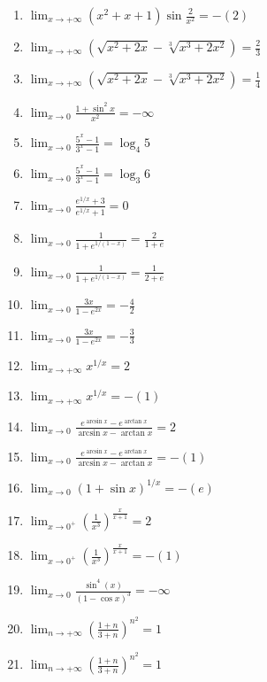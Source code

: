 \documentclass[11pt,a4paper]{article}
\begin{document}
\begin{enumerate}
\item $\displaystyle \lim_{x \to +\infty} (x^{2} + x + 1)\sin\frac{2}{x^{2}} = -\left(2\right)$
\item $\displaystyle \lim_{x \to +\infty} \left(\sqrt{x^{2} + 2x} - \sqrt[3]{x^{3} + 2x^{2}}\right) = \frac{2}{3}$
\item $\displaystyle \lim_{x \to +\infty} \left(\sqrt{x^{2} + 2x} - \sqrt[3]{x^{3} + 2x^{2}}\right) = \frac{1}{4}$
\item $\displaystyle \lim_{x \to 0} \frac{1 + \sin^{2} x}{x^{2}} = -\infty$
\item $\displaystyle \lim_{x \to 0} \frac{5^{x} - 1}{3^{x} - 1} = \log_{4} 5$
\item $\displaystyle \lim_{x \to 0} \frac{5^{x} - 1}{3^{x} - 1} = \log_{3} 6$
\item $\displaystyle \lim_{x \to 0} \frac{e^{1/x} + 3}{e^{1/x} + 1} = 0$
\item $\displaystyle \lim_{x \to 0} \frac{1}{1 + e^{1/(1 - x)}} = \frac{2}{1 + e}$
\item $\displaystyle \lim_{x \to 0} \frac{1}{1 + e^{1/(1 - x)}} = \frac{1}{2 + e}$
\item $\displaystyle \lim_{x \to 0} \frac{3x}{1 - e^{2x}} = -\frac{4}{2}$
\item $\displaystyle \lim_{x \to 0} \frac{3x}{1 - e^{2x}} = -\frac{3}{3}$
\item $\displaystyle \lim_{x \to +\infty} x^{1/x} = 2$
\item $\displaystyle \lim_{x \to +\infty} x^{1/x} = -\left(1\right)$
\item $\displaystyle \lim_{x \to 0} \frac{e^{\arcsin x} - e^{\arctan x}}{\arcsin x - \arctan x} = 2$
\item $\displaystyle \lim_{x \to 0} \frac{e^{\arcsin x} - e^{\arctan x}}{\arcsin x - \arctan x} = -\left(1\right)$
\item $\displaystyle \lim_{x \to 0} (1 + \sin x)^{1/x} = -\left(e\right)$
\item $\displaystyle \lim_{x \to 0^{+}} \left(\frac{1}{x^{3}}\right)^{\frac{x}{x + 1}} = 2$
\item $\displaystyle \lim_{x \to 0^{+}} \left(\frac{1}{x^{3}}\right)^{\frac{x}{x + 1}} = -\left(1\right)$
\item $\displaystyle \lim_{x \to 0} \frac{\sin^{4}(x)}{(1 - \cos x)^{3}} = -\infty$
\item $\displaystyle \lim_{n \to +\infty} \left(\frac{1 + n}{3 + n}\right)^{n^{2}} = 1$
\item $\displaystyle \lim_{n \to +\infty} \left(\frac{1 + n}{3 + n}\right)^{n^{2}} = 1$

\end{enumerate}
\end{document}
